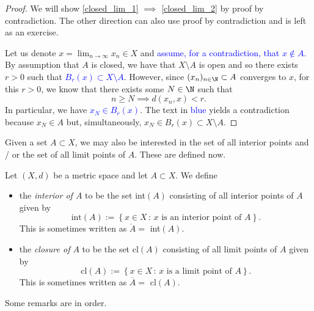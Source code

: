 \begin{proof}
We will show \ref{closed_lim_1} $\implies$ \ref{closed_lim_2} by proof by contradiction. The other direction can also use proof by contradiction and is left as an exercise.

Let us denote $x = \lim_{n\to \infty} x_n \in X$ and \textcolor{blue}{assume, for a contradiction, that $x \notin A$.} By assumption that $A$ is closed, we have that $X\setminus A$ is open and so there exists $r>0$ such that \textcolor{blue}{$B_r(x) \subset X\setminus A$}. However, since $(x_n)_{n\in\N}\subset A$ converges to $x$, for this $r>0$, we know that there exists some $N\in\N$ such that
\[
n\ge N \implies d(x_n,x)<r.
\]
In particular, we have \textcolor{blue}{$x_N \in B_r(x)$}. The text in \textcolor{blue}{blue} yields a contradiction because $x_N \in A$ but, simultaneously, $x_N \in B_r(x) \subset X\setminus A$.
\end{proof}
Given a set $A\subset X$, we may also be interested in the set of all interior points and / or the set of all limit points of $A$. These are defined now.
\begin{defn}
	\label{defn:int_clos}
	Let $(X,d)$ be a metric space and let $A\subset X$. We define
	\begin{itemize}
		\item the \textit{interior of $A$} to be the set int$(A)$ consisting of all interior points of $A$ given by
		\[
		\text{int}(A) := \left\{
		x\in X \, : \, x\text{ is an interior point of }A
		\right\}.
		\]
		This is sometimes written as $\mathring{A} = $ int$(A)$.
		\item the \textit{closure of $A$} to be the set cl$(A)$ consisting of all limit points of $A$ given by
		\[
		\text{cl}(A):= \left\{
		x\in X \, : \, x\text{ is a limit point of }A
		\right\}.
		\]
		This is sometimes written as $\overline{A} = $ cl$(A)$.
	\end{itemize}
\end{defn}
Some remarks are in order.
